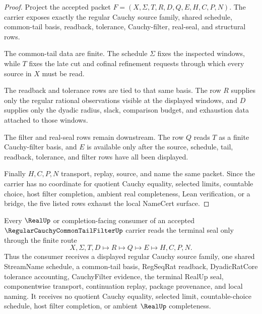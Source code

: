 \begin{proof}
Project the accepted packet $F=(X,\Sigma,T,R,D,Q,E,H,C,P,N)$. The carrier exposes exactly the regular Cauchy source family, shared schedule, common-tail basis, readback, tolerance, Cauchy-filter, real-seal, and structural rows.

The common-tail data are finite. The schedule $\Sigma$ fixes the inspected windows, while $T$ fixes the late cut and cofinal refinement requests through which every source in $X$ must be read.

The readback and tolerance rows are tied to that same basis. The row $R$ supplies only the regular rational observations visible at the displayed windows, and $D$ supplies only the dyadic radius, slack, comparison budget, and exhaustion data attached to those windows.

The filter and real-seal rows remain downstream. The row $Q$ reads $T$ as a finite Cauchy-filter basis, and $E$ is available only after the source, schedule, tail, readback, tolerance, and filter rows have all been displayed.

Finally $H,C,P,N$ transport, replay, source, and name the same packet. Since the carrier has no coordinate for quotient Cauchy equality, selected limits, countable choice, host filter completion, ambient real completeness, Lean verification, or a bridge, the five listed rows exhaust the local NameCert surface.
\end{proof}

\begin{theorem}
\label{thm:regular-cauchy-common-tail-filter-real-seal-boundary}
Every $\RealUp$ or completion-facing consumer of an accepted $\RegularCauchyCommonTailFilterUp$ carrier reads the terminal seal only through the finite route
$$
X,\Sigma,T,D \longmapsto R \longmapsto Q \longmapsto E \longmapsto H,C,P,N .
$$
Thus the consumer receives a displayed regular Cauchy source family, one shared StreamName schedule, a common-tail basis, RegSeqRat readback, DyadicRatCore tolerance accounting, CauchyFilter evidence, the terminal RealUp seal, componentwise transport, continuation replay, package provenance, and local naming. It receives no quotient Cauchy equality, selected limit, countable-choice schedule, host filter completion, or ambient $\RealUp$ completeness.
\end{theorem}

